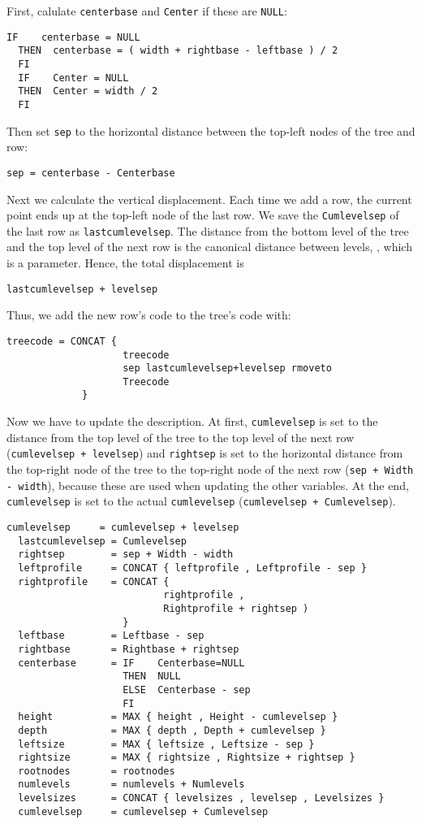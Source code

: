 \documentclass[11pt,english,BCOR10mm,DIV12,bibliography=totoc,parskip=false,smallheadings
    headexclude,footexclude,oneside]{pst-doc}
\begin{document}
  First, calulate \verb=centerbase= and \verb=Center= if these are \verb=NULL=:
\begin{lstlisting}[style=syntax]
  IF    centerbase = NULL
  THEN  centerbase = ( width + rightbase - leftbase ) / 2
  FI
  IF    Center = NULL
  THEN  Center = width / 2
  FI
\end{lstlisting}
Then set \verb|sep| to the horizontal distance between the top-left nodes of the tree and row:
\begin{lstlisting}[style=syntax]
  sep = centerbase - Centerbase
\end{lstlisting}

Next we calculate the vertical displacement. Each time we add a row, the current point ends up 
at the top-left node of the last row. We save the \verb=Cumlevelsep= of the last row as \verb=lastcumlevelsep=. 
The distance from the bottom level of the tree and the top level of the next row is the canonical distance 
between levels, , which is a parameter. Hence, the total displacement is
\begin{lstlisting}[style=syntax]
  lastcumlevelsep + levelsep
\end{lstlisting}

Thus, we add the new row's code to the tree's code with:
\begin{lstlisting}[style=syntax]
  treecode = CONCAT {
                    treecode 
                    sep lastcumlevelsep+levelsep rmoveto
                    Treecode
             }
\end{lstlisting}

Now we have to update the description. At first, \verb|cumlevelsep| is set to the distance from the top level of the tree 
to the top level of the next row (\verb=cumlevelsep + levelsep=) and \verb=rightsep= is set to the horizontal distance 
from the top-right node of the tree to the top-right node of the next row (\verb=sep + Width - width=), 
because these are used when updating the other variables. At the end, \verb=cumlevelsep= is set to the actual 
\verb=cumlevelsep= (\verb=cumlevelsep + Cumlevelsep=).

\begin{lstlisting}[style=syntax]
  cumlevelsep     = cumlevelsep + levelsep
  lastcumlevelsep = Cumlevelsep
  rightsep        = sep + Width - width
  leftprofile     = CONCAT { leftprofile , Leftprofile - sep }
  rightprofile    = CONCAT {
                           rightprofile ,
                           Rightprofile + rightsep )
                    }
  leftbase        = Leftbase - sep
  rightbase       = Rightbase + rightsep
  centerbase      = IF    Centerbase=NULL
                    THEN  NULL
                    ELSE  Centerbase - sep
                    FI
  height          = MAX { height , Height - cumlevelsep }
  depth           = MAX { depth , Depth + cumlevelsep }
  leftsize        = MAX { leftsize , Leftsize - sep }
  rightsize       = MAX { rightsize , Rightsize + rightsep }
  rootnodes       = rootnodes
  numlevels       = numlevels + Numlevels
  levelsizes      = CONCAT { levelsizes , levelsep , Levelsizes }
  cumlevelsep     = cumlevelsep + Cumlevelsep
\end{lstlisting}
\end{document}
